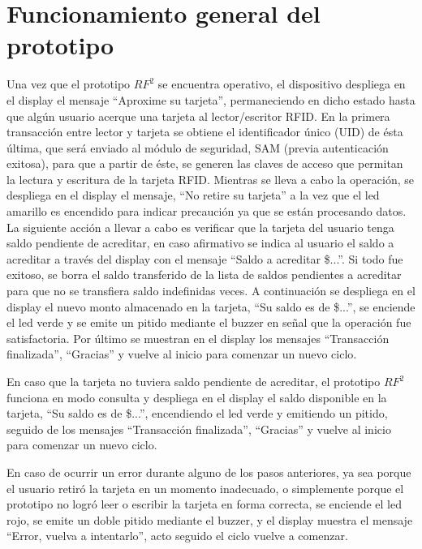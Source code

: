 \section{Funcionamiento general del prototipo}
Una vez que el prototipo $RF^{2}$ se encuentra operativo, el dispositivo despliega en el display el mensaje “Aproxime su tarjeta”, permaneciendo en dicho estado hasta que algún usuario acerque una tarjeta al lector/escritor RFID. 
En la primera transacción entre lector y tarjeta se obtiene el identificador único (UID) de ésta última, que será enviado al módulo de seguridad, SAM (previa autenticación exitosa), para que a partir de éste, se generen las claves de acceso que permitan la lectura y escritura de la tarjeta RFID.
Mientras se lleva a cabo la operación, se despliega en el display el mensaje, “No retire su tarjeta” a la vez que el led amarillo es encendido para indicar precaución ya que se están procesando datos.
La siguiente acción a llevar a cabo es verificar que la tarjeta del usuario tenga saldo pendiente de acreditar, en caso afirmativo se indica al usuario el saldo a acreditar a través del display con el mensaje “Saldo a acreditar \$...”. Si todo fue exitoso, se borra el saldo transferido de la lista de saldos pendientes a acreditar para que no se transfiera saldo indefinidas veces.
A continuación se despliega en el display el nuevo monto almacenado en la tarjeta, “Su saldo es de \$...”, se enciende el led verde y se emite un pitido mediante el buzzer en señal que la operación fue satisfactoria.
Por último se muestran en el display los mensajes “Transacción finalizada”, “Gracias” y vuelve al inicio para comenzar un nuevo ciclo.

En caso que la tarjeta no tuviera saldo pendiente de acreditar, el prototipo $RF^{2}$ funciona en modo consulta y despliega en el display el saldo disponible en la tarjeta, “Su saldo es de \$...”, encendiendo el led verde y emitiendo un pitido, seguido de los mensajes “Transacción finalizada”, “Gracias” y vuelve al inicio para comenzar un nuevo ciclo.

En caso de ocurrir un error durante alguno de los pasos anteriores, ya sea porque
el usuario retiró la tarjeta en un momento inadecuado, o simplemente porque el prototipo
no logró leer o escribir la tarjeta en forma correcta, se enciende el led rojo, se emite un
doble pitido mediante el buzzer, y el display muestra el mensaje “Error, vuelva a intentarlo”,
acto seguido el ciclo vuelve a comenzar. 

